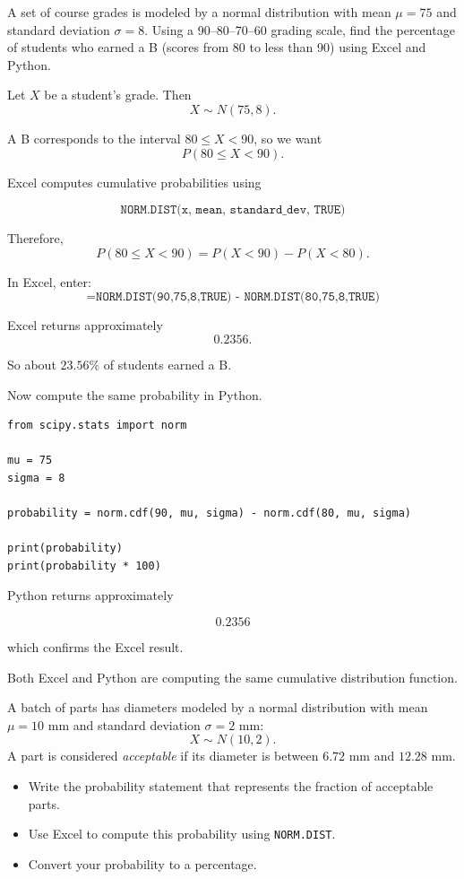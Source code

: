 \begin{Worked}
\begin{Problem}

A set of course grades is modeled by a normal distribution with mean $\mu = 75$
and standard deviation $\sigma = 8$. Using a 90--80--70--60 grading scale,
find the percentage of students who earned a B (scores from 80 to less than 90)
using Excel and Python.
\end{Problem}
\begin{Solution}
Let $X$ be a student's grade. Then
\[
X \sim N(75,8).
\]

A B corresponds to the interval $80 \le X < 90$, so we want
\[
P(80 \le X < 90).
\]

Excel computes cumulative probabilities using

\[
\texttt{NORM.DIST(x, mean, standard\_dev, TRUE)}
\]

Therefore,
\[
P(80 \le X < 90)
=
P(X < 90) - P(X < 80).
\]

In Excel, enter:
\[
\texttt{=NORM.DIST(90,75,8,TRUE) - NORM.DIST(80,75,8,TRUE)}
\]

Excel returns approximately
\[
0.2356.
\]

So about $23.56\%$ of students earned a B.

Now compute the same probability in Python.

\begin{verbatim}
from scipy.stats import norm

mu = 75
sigma = 8

probability = norm.cdf(90, mu, sigma) - norm.cdf(80, mu, sigma)

print(probability)
print(probability * 100)
\end{verbatim}

Python returns approximately

\[
0.2356
\]

which confirms the Excel result.
\end{Solution}
\end{Worked}

Both Excel and Python are computing the same cumulative distribution function.

\begin{Exercise}[label = normalt1]

A batch of parts has diameters modeled by a normal distribution with mean
$\mu = 10$ mm and standard deviation $\sigma = 2$ mm:
\[
X \sim N(10,2).
\]
A part is considered \emph{acceptable} if its diameter is between $6.72$ mm and
$12.28$ mm.

\begin{itemize}
    \item[(a)] Write the probability statement that represents the fraction of acceptable parts.
    \item[(b)] Use Excel to compute this probability using \texttt{NORM.DIST}.
    \item[(c)] Convert your probability to a percentage.
\end{itemize}

\end{Exercise}

